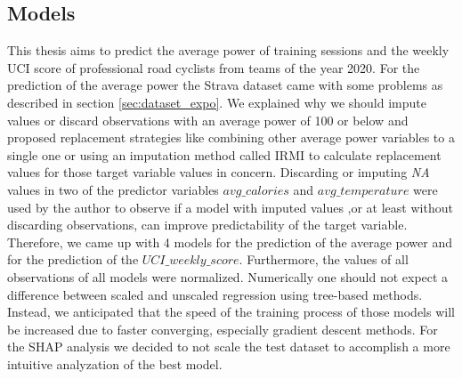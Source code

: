 \documentclass[12pt,a4paper]{article}
\begin{document}
\hypertarget{models}{%
\subsection{\texorpdfstring{Models \label{sec:models}}{Models }}\label{models}}

This thesis aims to predict the average power of training sessions and the weekly UCI score of professional road cyclists from teams of the year 2020. For the prediction of the average power the Strava dataset came with some problems as described in section \ref{sec:dataset_expo}. We explained why we should impute values or discard observations with an average power of 100 or below and proposed replacement strategies like combining other average power variables to a single one or using an imputation method called IRMI to calculate replacement values for those target variable values in concern. Discarding or imputing \textit{NA} values in two of the predictor variables \(avg\_calories\) and \(avg\_temperature\) were used by the author to observe if a model with imputed values ,or at least without discarding observations, can improve predictability of the target variable. Therefore, we came up with 4 models for the prediction of the average power and for the prediction of the \(UCI\_weekly\_score\). Furthermore, the values of all observations of all models were normalized. Numerically one should not expect a difference between scaled and unscaled regression using tree-based methods. Instead, we anticipated that the speed of the training process of those models will be increased due to faster converging, especially gradient descent methods. For the SHAP analysis we decided to not scale the test dataset to accomplish a more intuitive analyzation of the best model.
\end{document}
